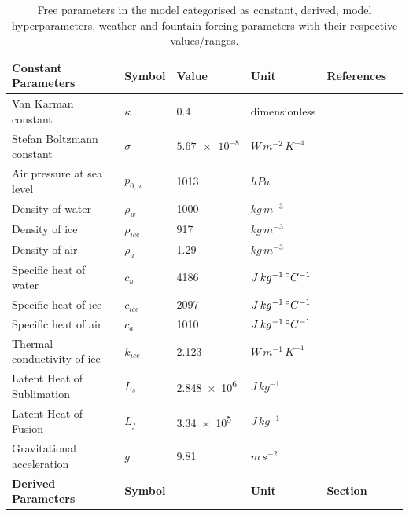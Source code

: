 \documentclass[utf8]{frontiersSCNS}
\begin{document}
\begin{table}[h!]
  \caption{Free parameters in the model categorised as constant, derived, model hyperparameters, weather and
  fountain forcing parameters with their respective values/ranges.}

	\label{tab:parameters}
	\begin{tabular}{@{}llllll@{}}
		\toprule
		\textbf{Constant Parameters}                       & \textbf{Symbol} & \textbf{Value} &
    \textbf{Unit} & \textbf{References} \\\midrule
    Van Karman constant & $\kappa$      & 0.4        &dimensionless & \citeauthor{CuffeyPaterson_2010}              \\
    Stefan Boltzmann constant & $\sigma$ & $\num{5.67 e-8} $& $W\, m^{-2}\, K^{-4}$ & \citeauthor{CuffeyPaterson_2010}\\
    Air pressure at sea level & $p_{0,a}$ & 1013 & $hPa$  & \citeauthor{MolgHardy_2004}\\
    Density of water & $\rho_{w}$ & 1000 & $kg\, m^{-3}$    & \citeauthor{CuffeyPaterson_2010}\\
    Density of ice & $\rho_{ice}$ & 917 & $kg\, m^{-3}$ & \citeauthor{CuffeyPaterson_2010}\\
    Density of air & $\rho_{a}$ &  1.29 & $kg\, m^{-3}$   & \citeauthor{MolgHardy_2004}\\
    Specific heat of water & $c_{w}$ & 4186 & $J\, kg^{-1}\,\degree C^{-1}$  & \citeauthor{CuffeyPaterson_2010}\\
    Specific heat of ice & $c_{ice}$ & 2097 & $J\, kg^{-1}\,\degree C^{-1}$ & \citeauthor{CuffeyPaterson_2010}\\
    Specific heat of air & $c_{a}$ & 1010 & $J\, kg^{-1}\,\degree C^{-1}$ & \citeauthor{MolgHardy_2004}\\
    Thermal conductivity of ice & $k_{ice}$ & 2.123  & $W\, m^{-1}\, K^{-1}$ & \citeauthor{Bonales_2017} \\
    Latent Heat of Sublimation & $L_{s}$ & \num{2.848e6}  & $J\, kg^{-1}$ &   \citeauthor{CuffeyPaterson_2010}\\
    Latent Heat of Fusion & $L_{f}$ & \num{3.34e5} & $J\, kg^{-1}$ & \citeauthor{CuffeyPaterson_2010}\\
    Gravitational acceleration & $g$ & 9.81 & $m\, s^{-2}$ &\citeauthor{CuffeyPaterson_2010}\\\midrule
		\textbf{Derived Parameters} & \textbf{Symbol} & \textbf{} & \textbf{Unit} & \textbf{Section} \\\midrule

\end{tabular}
\end{table}
\end{document}
